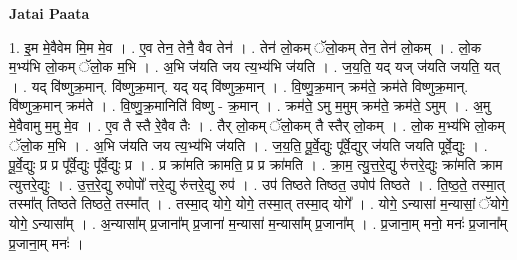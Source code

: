 \documentclass[17pt]{extarticle}
\begin{document}
\textbf{Jatai Paata} \newline

1. इ॒म मे॒वैवेम मि॒म मे॒व । . ए॒व तेन॒ तेनै॒ वैव तेन॑ । . तेन॑ लो॒कम् ॅलो॒कम् तेन॒ तेन॑ लो॒कम् । . लो॒क म॒भ्य॑भि लो॒कम् ॅलो॒क म॒भि । . अ॒भि ज॑यति जय त्य॒भ्य॑भि ज॑यति । . ज॒य॒ति॒ यद् यज् ज॑यति जयति॒ यत् । . यद् वि॑ष्णुक्र॒मान्. वि॑ष्णुक्र॒मान्. यद् यद् वि॑ष्णुक्र॒मान् । . वि॒ष्णु॒क्र॒मान् क्रम॑ते॒ क्रम॑ते विष्णुक्र॒मान्. वि॑ष्णुक्र॒मान् क्रम॑ते । . वि॒ष्णु॒क्र॒मानिति॑ विष्णु - क्र॒मान् । . क्रम॑ते॒ ऽमु म॒मुम् क्रम॑ते॒ क्रम॑ते॒ ऽमुम् । . अ॒मु मे॒वैवामु म॒मु मे॒व । . ए॒व तै स्तै रे॒वैव तैः । . तैर् लो॒कम् ॅलो॒कम् तै स्तैर् लो॒कम् । . लो॒क म॒भ्य॑भि लो॒कम् ॅलो॒क म॒भि । . अ॒भि ज॑यति जय त्य॒भ्य॑भि ज॑यति । . ज॒य॒ति॒ पू॒र्वे॒द्युः पू᳚र्वे॒द्युर् ज॑यति जयति पूर्वे॒द्युः । . पू॒र्वे॒द्युः प्र प्र पू᳚र्वे॒द्युः पू᳚र्वे॒द्युः प्र । . प्र क्रा॑मति क्रामति॒ प्र प्र क्रा॑मति । . क्रा॒म॒ त्यु॒त्त॒रे॒द्यु रु॑त्तरे॒द्युः क्रा॑मति क्राम त्युत्तरे॒द्युः । . उ॒त्त॒रे॒द्यु रुपोपो᳚ त्तरे॒द्यु रु॑त्तरे॒द्यु रुप॑ । . उप॑ तिष्ठते तिष्ठत॒ उपोप॑ तिष्ठते । . ति॒ष्ठ॒ते॒ तस्मा॒त् तस्मा᳚त् तिष्ठते तिष्ठते॒ तस्मा᳚त् । . तस्मा॒द् योगे॒ योगे॒ तस्मा॒त् तस्मा॒द् योगे᳚ । . योगे॒ ऽन्यासा॑ म॒न्यासां॒ ॅयोगे॒ योगे॒ ऽन्यासा᳚म् । . अ॒न्यासा᳚म् प्र॒जाना᳚म् प्र॒जाना॑ म॒न्यासा॑ म॒न्यासा᳚म् प्र॒जाना᳚म् । . प्र॒जाना॒म् मनो॒ मनः॑ प्र॒जाना᳚म् प्र॒जाना॒म् मनः॑ । \newline
\end{document}
